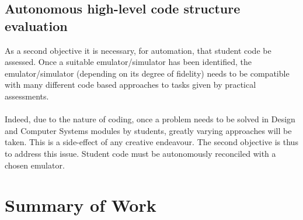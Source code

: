\subsection{Autonomous high-level code structure evaluation}
\label{highLevScope}
As a second objective it is necessary, for automation, that student code be assessed. Once a suitable emulator/simulator has been identified, the emulator/simulator (depending on its degree of fidelity) needs to be compatible with many different code based approaches to tasks given by practical assessments.
\\\\
Indeed, due to the nature of coding, once a problem needs to be solved in Design and Computer Systems modules by students, greatly varying approaches will be taken. This is a side-effect of any creative endeavour. The second objective is thus to address this issue. Student code must be autonomously reconciled with a chosen emulator.

\section{Summary of Work}
\label{sow}

